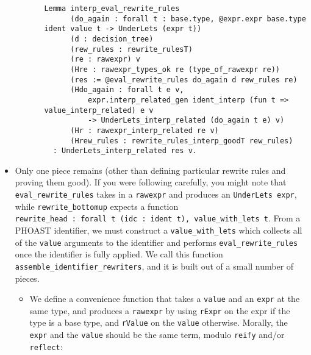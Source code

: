 \begin{itemize}
\begin{itemize}
\begin{itemize}
\begin{verbatim}
Lemma interp_eval_rewrite_rules
      (do_again : forall t : base.type, @expr.expr base.type ident value t -> UnderLets (expr t))
      (d : decision_tree)
      (rew_rules : rewrite_rulesT)
      (re : rawexpr) v
      (Hre : rawexpr_types_ok re (type_of_rawexpr re))
      (res := @eval_rewrite_rules do_again d rew_rules re)
      (Hdo_again : forall t e v,
          expr.interp_related_gen ident_interp (fun t => value_interp_related) e v
          -> UnderLets_interp_related (do_again t e) v)
      (Hr : rawexpr_interp_related re v)
      (Hrew_rules : rewrite_rules_interp_goodT rew_rules)
  : UnderLets_interp_related res v.
\end{verbatim}
    \end{itemize}
  \end{itemize}
\item
  Only one piece remains (other than defining particular rewrite rules
  and proving them good). If you were following carefully, you might
  note that \texttt{eval\_rewrite\_rules} takes in a \texttt{rawexpr}
  and produces an \texttt{UnderLets\ expr}, while
  \texttt{rewrite\_bottomup} expects a function
  \texttt{rewrite\_head\ :\ forall\ t\ (idc\ :\ ident\ t),\ value\_with\_lets\ t}.
  From a PHOAST identifier, we must construct a
  \texttt{value\_with\_lets} which collects all of the \texttt{value}
  arguments to the identifier and performs \texttt{eval\_rewrite\_rules}
  once the identifier is fully applied. We call this function
  \texttt{assemble\_identifier\_rewriters}, and it is built out of a
  small number of pieces.

  \begin{itemize}
  \item
    We define a convenience function that takes a \texttt{value} and an
    \texttt{expr} at the same type, and produces a \texttt{rawexpr} by
    using \texttt{rExpr} on the expr if the type is a base type, and
    \texttt{rValue} on the \texttt{value} otherwise. Morally, the
    \texttt{expr} and the \texttt{value} should be the same term, modulo
    \texttt{reify} and/or \texttt{reflect}:


\end{itemize}
\end{itemize}
